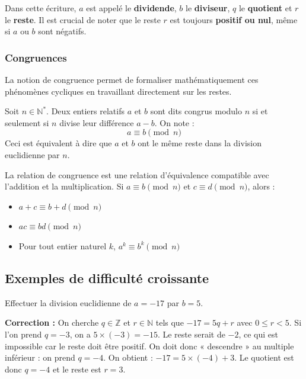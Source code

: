 \begin{remarque}
Dans cette écriture, $a$ est appelé le \textbf{dividende}, $b$ le \textbf{diviseur}, $q$ le \textbf{quotient} et $r$ le \textbf{reste}. Il est crucial de noter que le reste $r$ est toujours \textbf{positif ou nul}, même si $a$ ou $b$ sont négatifs.
\end{remarque}

\subsubsection{Congruences}

La notion de congruence permet de formaliser mathématiquement ces phénomènes cycliques en travaillant directement sur les restes.

\begin{definition}
Soit $n \in \mathbb{N}^*$. Deux entiers relatifs $a$ et $b$ sont dits congrus modulo $n$ si et seulement si $n$ divise leur différence $a - b$. On note :
$$a \equiv b \pmod{n}$$
Ceci est équivalent à dire que $a$ et $b$ ont le même reste dans la division euclidienne par $n$.
\end{definition}

\begin{propriete}
La relation de congruence est une relation d'équivalence compatible avec l'addition et la multiplication. Si $a \equiv b \pmod{n}$ et $c \equiv d \pmod{n}$, alors :
\begin{itemize}
    \item $a + c \equiv b + d \pmod{n}$
    \item $ac \equiv bd \pmod{n}$
    \item Pour tout entier naturel $k$, $a^k \equiv b^k \pmod{n}$
\end{itemize}
\end{propriete}

\subsection{Exemples de difficulté croissante}

\begin{exemple}
Effectuer la division euclidienne de $a = -17$ par $b = 5$.
\end{exemple}

\textbf{Correction :} On cherche $q \in \mathbb{Z}$ et $r \in \mathbb{N}$ tels que $-17 = 5q + r$ avec $0 \leq r < 5$. 
Si l'on prend $q = -3$, on a $5 \times (-3) = -15$. Le reste serait de $-2$, ce qui est impossible car le reste doit être positif. 
On doit donc « descendre » au multiple inférieur : on prend $q = -4$. 
On obtient : $-17 = 5 \times (-4) + 3$. 
Le quotient est donc $q = -4$ et le reste est $r = 3$.

